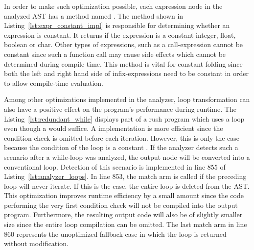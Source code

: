 
In order to make such optimization possible, each expression node in the analyzed AST has a method named .
The method shown in Listing~\ref{lst:expr_constant_impl} is responsible for determining whether an expression is constant.
It returns  if the expression is a constant integer, float, boolean or char.
Other types of expressions, such as a call-expression cannot be constant since such a function call may cause side effects which cannot be determined during compile time.
This method is vital for constant folding since both the left and right hand side of infix-expressions need to be constant in order to allow compile-time evaluation.


Among other optimizations implemented in the analyzer, loop transformation can also have a positive effect on the program's performance during runtime.
The Listing~\ref{lst:redundant_while} displays part of a rush program which uses a  loop even though a  would suffice.
A  implementation is more efficient since the condition check is omitted before each iteration.
However, this is only the case because the condition of the loop is a constant .
If the analyzer detects such a scenario after a while-loop was analyzed, the output node will be converted into a conventional loop.
Detection of this scenario is implemented in line 855 of Listing~\ref{lst:analyzer_loops}.
In line 853, the match arm is called if the preceding loop will never iterate.
If this is the case, the entire loop is deleted from the AST.
This optimization improves runtime efficiency by a small amount since the code performing the very first condition check will not be compiled into the output program.
Furthermore, the resulting output code will also be of slightly smaller size since the entire loop compilation can be omitted.
The last match arm in line 860 represents the unoptimized fallback case in which the loop is returned without modification.


